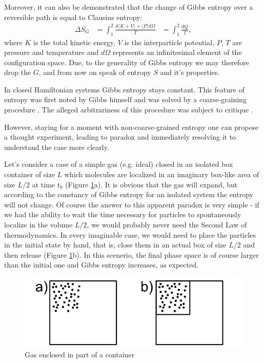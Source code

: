 \documentclass[a4paper,12pt]{article}
\begin{document}
Moreover, it can also be demonstrated \cite{Jaynes:1965gg} that the change of Gibbs entropy over a reversible path is equal to Clausius entropy:
\begin{equation}
\begin{aligned}
  \Delta S_G &= \int_1^2 \frac{d\langle K+ V \rangle+ \langle P \rangle d\Omega}{T}
  &= \int_1^2 \frac{dQ}{T},
\end{aligned}
\end{equation}
where $K$ is the total kinetic energy, $V$ is the interparticle potential, $P$, $T$ are pressure and temperature and $d\Omega$ represents an infinitesimal element of the configuration space.
Due, to the generality of Gibbs entropy we may therefore drop the $G$, and from now on speak of entropy $S$ and it's properties.

In closed Hamiltonian systems Gibbs entropy stays constant.
This feature of entropy was first noted by Gibbs himself and was solved by a coarse-graining procedure \cite{Gibbs:1928tw}. The alleged arbitrariness of this procedure was subject to critique \cite{Evans:2241458}. %

However, staying for a moment with non-coarse-grained entropy one can propose a thought experiment, leading to paradox and immediately resolving it to understand the case more clearly. 

Let's consider a case of a simple gas (e.g. ideal) closed in an isolated box container of size $L$ which molecules are localized in an imaginary box-like area of size $L/2$ at time $t_0$ (Figure \ref{Fig1}a).
It is obvious that the gas will expand, but according to the constancy of Gibbs entropy for an isolated system the entropy will not change. Of course the answer to this apparent paradox is very simple - if we had the ability to wait the time necessary for particles to spontaneously localize in the volume $L/2$, we would probably never need the Second Law of thermodynamics. In every imaginable case, we  would need to place the particles in the initial state by hand, that is, close them in an actual box of size $L/2$ and then release (Figure \ref{Fig1}b). 
In this scenerio, the final phase space is of course larger than the initial one and Gibbs entropy increases, as expected.

\begin{figure}[ht!]
\centering \includegraphics[width=12cm]{Figure1} \caption{Gas enclosed in part of a container}
\label{Fig1} 
\end{figure}
\end{document}
